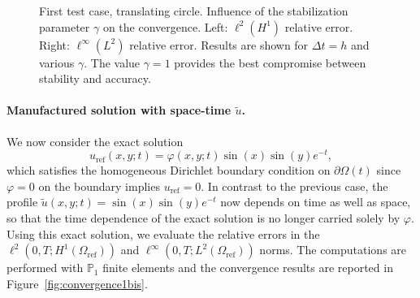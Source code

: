 \documentclass[11pt,a4paper]{article}
\theoremstyle{plain}
\theoremstyle{definition}
\theoremstyle{remark}
\numberwithin{equation}{section}
\newcommand{\logLogSlopeTriangle}[5]
{

    \pgfplotsextra
    {
        \pgfkeysgetvalue{/pgfplots/xmin}{\xmin}
        \pgfkeysgetvalue{/pgfplots/xmax}{\xmax}
        \pgfkeysgetvalue{/pgfplots/ymin}{\ymin}
        \pgfkeysgetvalue{/pgfplots/ymax}{\ymax}

        \pgfmathsetmacro{\xArel}{#1}
        \pgfmathsetmacro{\yArel}{#3}
        \pgfmathsetmacro{\xBrel}{#1-#2}
        \pgfmathsetmacro{\yBrel}{\yArel}
        \pgfmathsetmacro{\xCrel}{\xArel}

        \pgfmathsetmacro{\lnxB}{\xmin*(1-(#1-#2))+\xmax*(#1-#2)} %
        \pgfmathsetmacro{\lnxA}{\xmin*(1-#1)+\xmax*#1} %
        \pgfmathsetmacro{\lnyA}{\ymin*(1-#3)+\ymax*#3} %
        \pgfmathsetmacro{\lnyC}{\lnyA+#4*(\lnxA-\lnxB)}
        \pgfmathsetmacro{\yCrel}{(\lnyC-\ymin)/(\ymax-\ymin)} %

        \coordinate (A) at (rel axis cs:\xArel,\yArel);
        \coordinate (B) at (rel axis cs:\xBrel,\yBrel);
        \coordinate (C) at (rel axis cs:\xCrel,\yCrel);

        \draw[#5]   (A)-- node[pos=0.5,anchor=north] {1}
                    (B)--
                    (C)-- node[pos=0.5,anchor=west] {#4}
                    cycle;
    }
}
\begin{document}
\begin{figure}

    \begin{center}
    \end{center}

    \caption{First test case, translating circle. Influence of the stabilization parameter $\gamma$ on the convergence. Left: $\ell^2(H^1)$ relative error. Right: $\ell^\infty(L^2)$ relative error. Results are shown for $\Delta t = h$ and various $\gamma$. The value $\gamma = 1$ provides the best compromise between stability and accuracy.}
    \label{fig:gamma}
\end{figure}


\paragraph{\texorpdfstring{Manufactured solution with space-time $\tilde{u}$.}{Manufactured solution with space-time u-tilde.}}
We now consider the exact solution
\begin{equation}
    u_{\mathrm{ref}}(x,y;t)
    =
    \varphi(x,y;t)\sin(x)\sin(y)e^{-t},
    \label{Eq:manufactured solution time-dependent}
\end{equation}
which satisfies the homogeneous Dirichlet boundary condition on $\partial\Omega(t)$ since $\varphi=0$ on the boundary implies $u_{\mathrm{ref}}=0$. In contrast to the previous case, the profile $\tilde{u}(x,y;t) = \sin(x)\sin(y)e^{-t}$ now depends on time as well as space, so that the time dependence of the exact solution is no longer carried solely by $\varphi$. Using this exact solution, we evaluate the relative errors in the $\ell^2(0,T;H^1(\Omega_{\mathrm{ref}}))$ and $\ell^\infty(0,T;L^2(\Omega_{\mathrm{ref}}))$ norms. The computations are performed with $\mathbb{P}_1$ finite elements and the convergence results are reported in Figure~\ref{fig:convergence1bis}.
\end{document}

